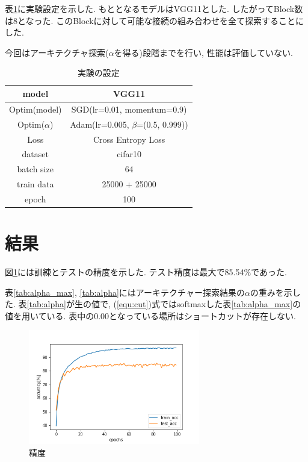 \documentclass[twocolumn]{jarticle}     %
\begin{document}
表\ref{tab:setting}に実験設定を示した.
もととなるモデルはVGG11とした.
したがってBlock数は8となった.
このBlockに対して可能な接続の組み合わせを全て探索することにした.

今回はアーキテクチャ探索($\alpha$を得る)段階までを行い, 性能は評価していない.

\begin{table}[tb]
  \begin{center}
    \caption{実験の設定}
    \begin{tabular}{|c|c|} \hline
      model & VGG11 \\ \hline
      Optim(model) & SGD(lr=0.01, momentum=0.9) \\ \hline
      Optim($\alpha$) & Adam(lr=0.005, $\beta$=(0.5, 0.999)) \\ \hline
      Loss & Cross Entropy Loss \\ \hline
      dataset & cifar10 \\ \hline
      batch size & 64 \\ \hline
      train data & 25000 + 25000 \\ \hline
      epoch & 100 \\ \hline
    \end{tabular}
    \label{tab:setting}
  \end{center}
\end{table}

\section{結果}

図\ref{fig:acc}には訓練とテストの精度を示した.
テスト精度は最大で85.54\%であった.

表\ref{tab:alpha_max}, \ref{tab:alpha}にはアーキテクチャー探索結果の$\alpha$の重みを示した.
表\ref{tab:alpha}が生の値で, (\ref{equ:cut})式ではsoftmaxした表\ref{tab:alpha_max}の値を用いている. 表中の0.00となっている場所はショートカットが存在しない.

\begin{figure}[tb]
	\begin{center}
		\includegraphics[clip,width=7.5cm]{acc.png}
		\caption{精度}
		\label{fig:acc}
	\end{center}
\end{figure}
\end{document}
